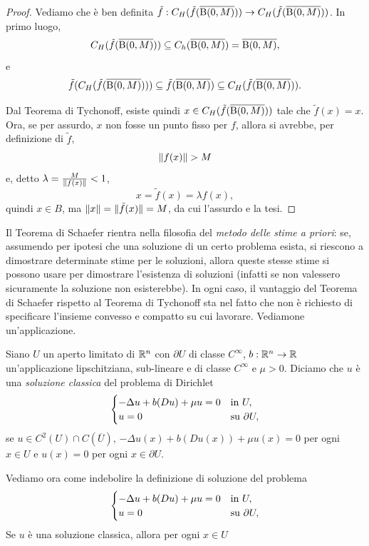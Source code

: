 \begin{proof}
	Vediamo che è ben definita $\tilde{f}: C_H(\tilde{f}(\overline{\textup{B}(0,M)})) \to C_H(\tilde{f}(\overline{\textup{B}(0,M)}))$. In primo luogo,
	\[ C_H(\tilde{f}(\overline{\textup{B}(0,M)})) \subseteq C_h(\overline{\textup{B}(0,M)}) = \overline{\textup{B}(0,M)}, \]
	e
	\[ \tilde{f}(C_H(\tilde{f}(\overline{\textup{B}(0,M)}))) \subseteq \tilde{f}(\overline{\textup{B}(0,M)}) \subseteq C_H(\tilde{f}(\overline{\textup{B}(0,M)})). \]
	
	Dal Teorema di Tychonoff, esiste quindi $x \in C_H(\tilde{f}(\overline{\textup{B}(0,M)}))$ tale che $\tilde{f}(x) = x$. Ora, se per assurdo, $x$ non fosse un punto fisso per $f$, allora si avrebbe, per definizione di $\tilde{f}$, 
	\[ \lVert f(x)\rVert > M \]
	e, detto $\lambda = \frac{M}{\lVert f(x)\rVert} <1$, 
	\[ x = \tilde{f}(x) = \lambda f(x), \]
	quindi $x \in B$, ma $\lVert x\rVert = \lVert\tilde{f}(x)\rVert = M$, da cui l'assurdo e la tesi.
\end{proof}
Il Teorema di Schaefer rientra nella filosofia del \emph{metodo delle stime a priori}: se, assumendo per ipotesi che una soluzione di un certo problema esista, si riescono a dimostrare determinate stime per le soluzioni, allora queste stesse stime si possono usare per dimostrare l'esistenza di soluzioni (infatti se non valessero sicuramente la soluzione non esisterebbe). In ogni caso, il vantaggio del Teorema di Schaefer rispetto al Teorema di Tychonoff sta nel fatto che non è richiesto di specificare l'insieme convesso e compatto su cui lavorare. Vediamone un'applicazione.
\begin{definizione}
	Siano $U$ un aperto limitato di $\mathbb{R}^n$ con $\partial U$ di classe $C^\infty$, $b: \mathbb{R}^n \to \mathbb{R}$ un'applicazione lipschitziana, sub-lineare e di classe $C^\infty$ e $\mu >0$. Diciamo che $u$ è una \emph{soluzione classica} del problema di Dirichlet
	\[ 	\begin{cases}
		-\Delta u + b(Du) + \mu u = 0 & \textup{in } U,\\
		u = 0 & \textup{su } \partial U,
	\end{cases} \]
	se $u \in C^2(U)\cap C(\overline{U})$, $-\Delta u(x) + b(Du(x)) + \mu u(x) = 0$ per ogni $x \in U$ e $u(x) = 0$ per ogni $x \in \partial U$.
\end{definizione}
Vediamo ora come indebolire la definizione di soluzione del problema 
\[ 	\begin{cases}
	-\Delta u + b(Du) + \mu u = 0 & \textup{in } U,\\
	u = 0 & \textup{su } \partial U,
\end{cases} \]
Se $u$ è una soluzione classica, allora per ogni $x \in U$
